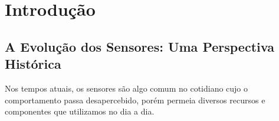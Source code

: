 \section{Introdução}
\label{sec:introducao}

\subsection*{A Evolução dos Sensores: Uma Perspectiva Histórica}
Nos tempos atuais, os sensores são algo comum no cotidiano cujo o comportamento passa desapercebido, \cite{ferreira_2016_biblioteca} porém permeia diversos recursos e componentes que utilizamos no dia a dia. 

